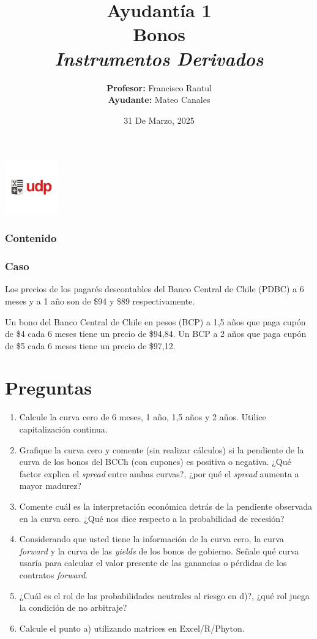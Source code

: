 \documentclass{beamer}
\title{Ayudantía 1 \\ Bonos \\ \large\textit{Instrumentos Derivados}}
\author{
  \texorpdfstring{
    \textbf{Profesor:} Francisco Rantul \\[0.3em]
    \textbf{Ayudante:} Mateo Canales
  }{Profesor: Francisco Rantul, Ayudante: Mateo Canales}
}
\institute{Universidad Diego Portales}
\date{31 De Marzo, 2025}
\begin{document}
\begin{frame}
    \titlepage
    \vfill
    \centering
    \includegraphics[width=2.3118cm]{../imagenes/logo.png}
  \end{frame}
\begin{frame}
  \frametitle{Contenido}
  \tableofcontents
\end{frame}
\begin{frame}
  \frametitle{Caso}

  Los precios de los pagarés descontables del Banco Central de Chile (PDBC)
  a 6 meses y a 1 año son de \$94 y \$89 respectivamente. 
  
  Un bono del Banco Central de Chile en pesos (BCP) a 1,5 años que paga cupón de 
  \$4 cada 6 meses tiene un precio de \$94{,}84. Un BCP a 2 años que paga
  cupón de \$5 cada 6 meses tiene un precio de \$97{,}12.

\end{frame}
\section{Preguntas}
  \begin{frame} 
  
\begin{enumerate}[label=\textbf{\alph*)}]
  \item Calcule la curva cero de 6 meses, 1 año, 1,5 años y 2 años.
   Utilice capitalización continua.
  
  \item Grafique la curva cero y comente (sin realizar cálculos) si 
  la pendiente de la curva de los bonos del BCCh (con cupones) es 
  positiva o negativa. ¿Qué factor explica el \textit{spread} entre 
  ambas curvas?, ¿por qué el \textit{spread} aumenta a mayor madurez?
  
  \item Comente cuál es la interpretación económica detrás de la 
  pendiente observada en la curva cero. ¿Qué nos dice respecto a 
  la probabilidad de recesión?
  
  \item Considerando que usted tiene la información de la curva cero, 
  la curva \textit{forward} y la curva de las \textit{yields} de los 
  bonos de gobierno. Señale qué curva usaría para calcular el valor 
  presente de las ganancias o pérdidas de los contratos \textit{forward}.
  
  \item ¿Cuál es el rol de las probabilidades neutrales al riesgo en d)?, 
  ¿qué rol juega la condición de no arbitraje?
  
  \item Calcule el punto a) utilizando matrices en Excel/R/Phyton.
\end{enumerate}

  \end{frame}  
\end{document}
